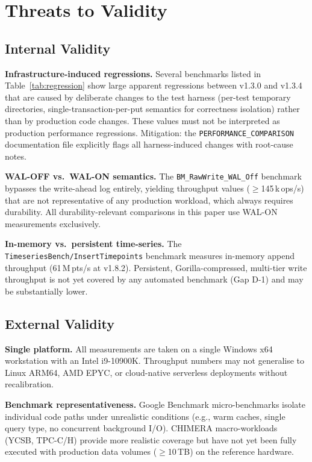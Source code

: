 \documentclass[conference]{IEEEtran}
\begin{document}
\section{Threats to Validity}
\label{sec:threats}

\subsection{Internal Validity}
\label{ssec:int-valid}

\textbf{Infrastructure-induced regressions.}
Several benchmarks listed in Table~\ref{tab:regression} show
large apparent regressions between v1.3.0 and v1.3.4 that are
caused by deliberate changes to the test harness (per-test temporary
directories, single-transaction-per-put semantics for correctness
isolation) rather than by production code changes.
These values must not be interpreted as production performance
regressions.
Mitigation: the \texttt{PERFORMANCE\_COMPARISON} documentation file
explicitly flags all harness-induced changes with root-cause notes.

\textbf{WAL-OFF vs.\ WAL-ON semantics.}
The \texttt{BM\_RawWrite\_WAL\_Off} benchmark bypasses the
write-ahead log entirely, yielding throughput values
($\geq$145\,k\,ops/s) that are not representative of any production
workload, which always requires durability.
All durability-relevant comparisons in this paper use WAL-ON
measurements exclusively.

\textbf{In-memory vs.\ persistent time-series.}
The \texttt{TimeseriesBench/InsertTimepoints} benchmark measures
in-memory append throughput (61\,M\,pts/s at v1.8.2).
Persistent, Gorilla-compressed, multi-tier write throughput is
not yet covered by any automated benchmark (Gap D-1) and may be
substantially lower.

\subsection{External Validity}
\label{ssec:ext-valid}

\textbf{Single platform.}
All measurements are taken on a single Windows x64 workstation with
an Intel i9-10900K.
Throughput numbers may not generalise to Linux ARM64, AMD EPYC,
or cloud-native serverless deployments without recalibration.

\textbf{Benchmark representativeness.}
Google Benchmark micro-benchmarks isolate individual code paths under
unrealistic conditions (e.g., warm caches, single query type, no
concurrent background I/O).
CHIMERA macro-workloads (YCSB, TPC-C/H) provide more realistic
coverage but have not yet been fully executed with production data
volumes ($\geq$10\,TB) on the reference hardware.
\end{document}
